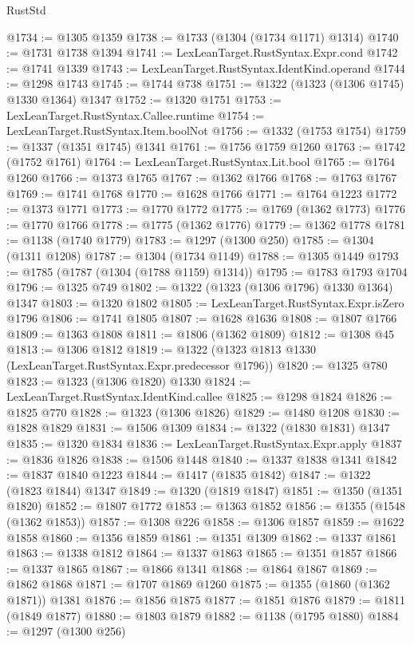 \begin{lexlean}{RustStd}
\begin{coremodule}
@1734 := @1305 @1359
@1738 := @1733 (@1304 (@1734 @1171) @1314)
@1740 := @1731 @1738 @1394
@1741 := LexLeanTarget.RustSyntax.Expr.cond
@1742 := @1741 @1339
@1743 := LexLeanTarget.RustSyntax.IdentKind.operand
@1744 := @1298 @1743
@1745 := @1744 @738
@1751 := @1322 (@1323 (@1306 @1745) @1330 @1364) @1347
@1752 := @1320 @1751
@1753 := LexLeanTarget.RustSyntax.Callee.runtime
@1754 := LexLeanTarget.RustSyntax.Item.boolNot
@1756 := @1332 (@1753 @1754)
@1759 := @1337 (@1351 @1745) @1341
@1761 := @1756 @1759 @1260
@1763 := @1742 (@1752 @1761)
@1764 := LexLeanTarget.RustSyntax.Lit.bool
@1765 := @1764 @1260
@1766 := @1373 @1765
@1767 := @1362 @1766
@1768 := @1763 @1767
@1769 := @1741 @1768
@1770 := @1628 @1766
@1771 := @1764 @1223
@1772 := @1373 @1771
@1773 := @1770 @1772
@1775 := @1769 (@1362 @1773)
@1776 := @1770 @1766
@1778 := @1775 (@1362 @1776)
@1779 := @1362 @1778
@1781 := @1138 (@1740 @1779)
@1783 := @1297 (@1300 @250)
@1785 := @1304 (@1311 @1208)
@1787 := @1304 (@1734 @1149)
@1788 := @1305 @1449
@1793 := @1785 (@1787 (@1304 (@1788 @1159) @1314))
@1795 := @1783 @1793 @1704
@1796 := @1325 @749
@1802 := @1322 (@1323 (@1306 @1796) @1330 @1364) @1347
@1803 := @1320 @1802
@1805 := LexLeanTarget.RustSyntax.Expr.isZero @1796
@1806 := @1741 @1805
@1807 := @1628 @1636
@1808 := @1807 @1766
@1809 := @1363 @1808
@1811 := @1806 (@1362 @1809)
@1812 := @1308 @45
@1813 := @1306 @1812
@1819 := @1322 (@1323 @1813 @1330 (LexLeanTarget.RustSyntax.Expr.predecessor @1796))
@1820 := @1325 @780
@1823 := @1323 (@1306 @1820) @1330
@1824 := LexLeanTarget.RustSyntax.IdentKind.callee
@1825 := @1298 @1824
@1826 := @1825 @770
@1828 := @1323 (@1306 @1826)
@1829 := @1480 @1208
@1830 := @1828 @1829
@1831 := @1506 @1309
@1834 := @1322 (@1830 @1831) @1347
@1835 := @1320 @1834
@1836 := LexLeanTarget.RustSyntax.Expr.apply
@1837 := @1836 @1826
@1838 := @1506 @1448
@1840 := @1337 @1838 @1341
@1842 := @1837 @1840 @1223
@1844 := @1417 (@1835 @1842)
@1847 := @1322 (@1823 @1844) @1347
@1849 := @1320 (@1819 @1847)
@1851 := @1350 (@1351 @1820)
@1852 := @1807 @1772
@1853 := @1363 @1852
@1856 := @1355 (@1548 (@1362 @1853))
@1857 := @1308 @226
@1858 := @1306 @1857
@1859 := @1622 @1858
@1860 := @1356 @1859
@1861 := @1351 @1309
@1862 := @1337 @1861
@1863 := @1338 @1812
@1864 := @1337 @1863
@1865 := @1351 @1857
@1866 := @1337 @1865
@1867 := @1866 @1341
@1868 := @1864 @1867
@1869 := @1862 @1868
@1871 := @1707 @1869 @1260
@1875 := @1355 (@1860 (@1362 @1871)) @1381
@1876 := @1856 @1875
@1877 := @1851 @1876
@1879 := @1811 (@1849 @1877)
@1880 := @1803 @1879
@1882 := @1138 (@1795 @1880)
@1884 := @1297 (@1300 @256)

\end{coremodule}
\end{lexlean}
